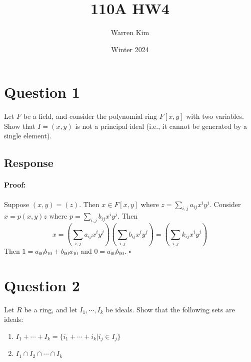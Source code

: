 \documentclass [12pt] {article}
\title{110A HW4}
\author{Warren Kim}
\date{Winter 2024}
\newenvironment{proof}{\paragraph{Proof:}}{\hfill$\square$}
\begin{document}
\maketitle

\section*{Question 1}
Let $F$ be a field, and consider the polynomial ring $F[x,y]$ with two variables. Show that $I=(x,y)$ is not a principal ideal (i.e., it cannot be generated by a single element). 
\subsection*{Response}
\begin{proof}
    Suppose $(x, y) = (z)$. Then $x \in F[x, y]$ where $z = \sum_{i, j} a_{ij} x^i y^j$. Consider
    $x = p(x, y)z$ where $p = \sum_{i, j} b_{ij} x^i y^j$. Then 
    \[
        x = \left( \sum_{i, j} a_{ij} x^i y^j \right) \left( \sum_{i, j} b_{ij} x^i y^j \right)
        = \left( \sum_{i, j} k_{ij} x^i y^j \right)
    \]
    Then $1 = a_{00} b_{10} + b_{00} a_{10}$ and $0 = a_{00} b_{00}$.
\end{proof}
\newpage

\section*{Question 2}
Let $R$ be a ring, and let $I_1,\cdots,I_k$ be ideals. Show that the following sets are ideals: 
\begin{enumerate}
    \item $I_1+\cdots+I_k=\{i_1+\cdots+i_k|i_j\in I_j\}$
    \item $I_1\cap I_2\cap \cdots\cap I_k$
\end{enumerate}
\vspace{-1em}
\end{document}
